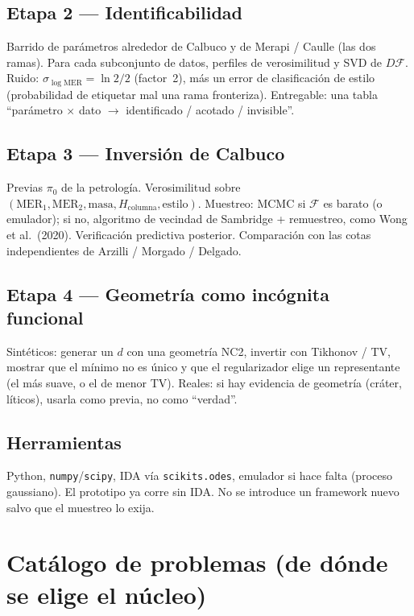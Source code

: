 \documentclass[11pt,a4paper]{article}
\theoremstyle{plain}
\theoremstyle{definition}
\theoremstyle{remark}
\newcommand{\MER}{\mathrm{MER}}
\newcommand{\F}{\mathcal{F}}
\begin{document}
\subsection{Etapa 2 --- Identificabilidad}

Barrido de parámetros alrededor de Calbuco y de Merapi / Caulle
(las dos ramas). Para cada subconjunto de datos, perfiles de
verosimilitud y SVD de $D\F$. Ruido:
$\sigma_{\log\MER}=\ln 2/2$ (factor~2), más un error de
clasificación de estilo (probabilidad de etiquetar mal una rama
fronteriza). Entregable: una tabla ``parámetro $\times$ dato
$\to$ identificado / acotado / invisible''.

\subsection{Etapa 3 --- Inversión de Calbuco}

Previas $\pi_0$ de la petrología. Verosimilitud sobre
$(\MER_1,\MER_2,\mathrm{masa},H_{\mathrm{columna}},\mathrm{estilo})$.
Muestreo: MCMC si $\F$ es barato (o emulador); si no, algoritmo
de vecindad de Sambridge + remuestreo, como Wong et al.\ (2020).
Verificación predictiva posterior. Comparación con las cotas
independientes de Arzilli / Morgado / Delgado.

\subsection{Etapa 4 --- Geometría como incógnita funcional}

Sintéticos: generar un $d$ con una geometría NC2, invertir con
Tikhonov / TV, mostrar que el mínimo no es único y que el
regularizador elige un representante (el más suave, o el de
menor TV). Reales: si hay evidencia de geometría (cráter,
líticos), usarla como previa, no como ``verdad''.

\subsection{Herramientas}

Python, \texttt{numpy}/\texttt{scipy}, IDA vía
\texttt{scikits.odes}, emulador si hace falta (proceso gaussiano).
El prototipo ya corre sin IDA. No se introduce un framework nuevo
salvo que el muestreo lo exija.

\section{Catálogo de problemas (de dónde se elige el núcleo)}
\label{sec:catalogo}
\end{document}

